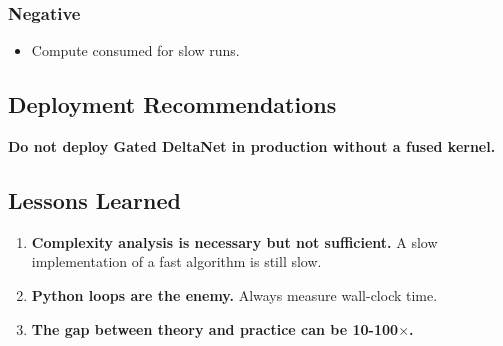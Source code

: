 \subsubsection{Negative}

\begin{itemize}
\item Compute consumed for slow runs.

\end{itemize}
\subsection{Deployment Recommendations}

\textbf{Do not deploy Gated DeltaNet in production without a fused kernel.}

\subsection{Lessons Learned}

\begin{enumerate}
\item \textbf{Complexity analysis is necessary but not sufficient.} A slow
  implementation of a fast algorithm is still slow.
\item \textbf{Python loops are the enemy.} Always measure wall-clock time.
\item \textbf{The gap between theory and practice can be 10-100$\times$.}

\end{enumerate}
